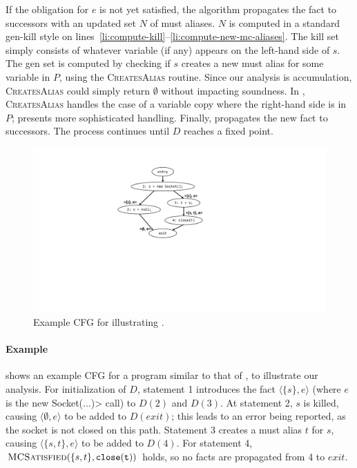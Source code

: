 If the obligation for $e$ is not yet satisfied, the algorithm propagates the
fact to successors with an updated set $N$ of must aliases.  $N$ is computed in
a standard gen-kill style on
lines~\ref{li:compute-kill}--\ref{li:compute-new-mc-aliases}.  The kill set
simply consists of whatever variable (if any) appears on the left-hand side of
$s$.  The gen set is computed by checking if $s$ creates a new must alias for
some variable in $P$, using the \textsc{CreatesAlias} routine.  Since our
analysis is accumulation, \textsc{CreatesAlias} could simply return
$\emptyset$
without impacting soundness.  In , \textsc{CreatesAlias}
handles the case of a variable copy where the right-hand side is in $P$;
 presents more sophisticated handling. Finally,
 propagates the new fact to successors.  The process
continues until $D$ reaches a fixed point.

\begin{figure}
  \includegraphics[width=0.65\columnwidth,keepaspectratio]{cfg-example.pdf}
  \caption{Example CFG for illustrating .}
  \label{fig:cfg-example}
\end{figure}

\paragraph{Example}  shows an example CFG for a program
similar to that of , to illustrate our analysis.  For
initialization of $D$, statement 1 introduces the fact $\langle \{ s \}, e
\rangle$ (where $e$ is the \<new Socket(...)> call) to $D(2)$ and $D(3)$.  At
statement 2, $s$ is killed, causing $\langle \emptyset , e \rangle$ to be added
to $D(\mathit{exit})$; this leads to an error being reported, as the socket is
not closed on this path.  Statement 3 creates a must alias $t$ for $s$, causing
$\langle \{ s, t \}, e \rangle$ to be added to $D(4)$.  For statement 4,
$\textsc{MCSatisfied}(\{s,t\},\mathtt{close(t)})$ holds, so no facts are
propagated from 4 to $\mathit{exit}$.

